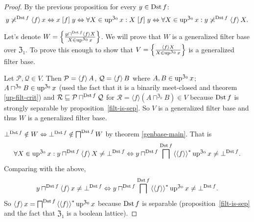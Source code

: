 \begin{proof}
By the previous proposition for every $y\in\operatorname{Dst} f$:
\[
y\not\asymp^{\operatorname{Dst} f}\left\langle f\right\rangle x\Leftrightarrow x\mathrel{\left[f\right]}y\Leftrightarrow\forall X\in\operatorname{up}^{\mathfrak{Z}_{0}}x:X\mathrel{\left[f\right]}y\Leftrightarrow\forall X\in\operatorname{up}^{\mathfrak{Z}_{0}}x:y\not\asymp^{\operatorname{Dst} f}\left\langle f\right\rangle X.
\]


Let's denote $W=\left\{ \frac{y\sqcap^{\operatorname{Dst} f}\left\langle f\right\rangle X}{X\in\operatorname{up}^{\mathfrak{Z}_{0}}x}\right\}$.
We will prove that $W$ is a generalized filter base over $\mathfrak{Z}_{1}$.
To prove this enough to show that $V=\left\{ \frac{\left\langle f\right\rangle X}{X\in\operatorname{up}^{\mathfrak{Z}_{0}}x}\right\}$
is a generalized filter base.

Let $\mathcal{P},\mathcal{Q}\in V$. Then $\mathcal{P}=\left\langle f\right\rangle A$,
$\mathcal{Q}=\left\langle f\right\rangle B$ where $A,B\in\operatorname{up}^{\mathfrak{Z}_{0}}x$;
$A\sqcap^{\mathfrak{Z}_{0}}B\in\operatorname{up}^{\mathfrak{Z}_{0}}x$
(used the fact that it is a binarily meet-closed and theorem \ref{up-filt-crit})
and $\mathcal{R}\sqsubseteq\mathcal{P}\sqcap^{\operatorname{Dst} f}\mathcal{Q}$
for $\mathcal{R}=\langle f\rangle(A\sqcap^{\mathfrak{Z}_{0}}B)\in V$
because $\operatorname{Dst} f$ is strongly separable by proposition~\ref{filt-is-sep}. So $V$
is a generalized filter base and thus $W$ is a generalized filter
base.

$\bot^{\operatorname{Dst} f}\notin W\Leftrightarrow\bot^{\operatorname{Dst} f}\notin\bigsqcap^{\operatorname{Dst} f}W$
by theorem \ref{genbase-main}. That is
\[
\forall X\in\operatorname{up}^{\mathfrak{Z}_{0}}x:y\sqcap^{\operatorname{Dst} f}\left\langle f\right\rangle X\ne\bot^{\operatorname{Dst} f}\Leftrightarrow y\sqcap^{\operatorname{Dst} f}\bigsqcap^{\operatorname{Dst} f}\left\langle \left\langle f\right\rangle\right\rangle ^{\ast}\operatorname{up}^{\mathfrak{Z}_{0}}x\ne\bot^{\operatorname{Dst} f}.
\]
Comparing with the above, 
\[
y\sqcap^{\operatorname{Dst} f}\left\langle f\right\rangle x\ne\bot^{\operatorname{Dst} f}\Leftrightarrow y\sqcap^{\operatorname{Dst} f}\bigsqcap^{\operatorname{Dst} f}\left\langle \left\langle f\right\rangle\right\rangle ^{\ast}\operatorname{up}^{\mathfrak{Z}_{0}}x\ne\bot^{\operatorname{Dst} f}.
\]
So $\left\langle f\right\rangle x=\bigsqcap^{\operatorname{Dst} f}\left\langle \left\langle f\right\rangle\right\rangle ^{\ast}\operatorname{up}^{\mathfrak{Z}_{0}}x$
because $\operatorname{Dst} f$ is separable (proposition~\ref{filt-is-sep} and the
fact that $\mathfrak{Z}_{1}$ is a boolean lattice).\end{proof}
